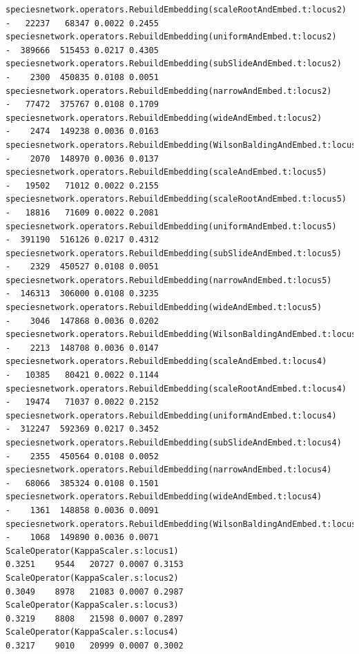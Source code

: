 \documentclass[11pt]{article}
\begin{document}
{\begin{verbatim}
speciesnetwork.operators.RebuildEmbedding(scaleRootAndEmbed.t:locus2)           -   22237   68347 0.0022 0.2455 
speciesnetwork.operators.RebuildEmbedding(uniformAndEmbed.t:locus2)             -  389666  515453 0.0217 0.4305 
speciesnetwork.operators.RebuildEmbedding(subSlideAndEmbed.t:locus2)            -    2300  450835 0.0108 0.0051 
speciesnetwork.operators.RebuildEmbedding(narrowAndEmbed.t:locus2)              -   77472  375767 0.0108 0.1709 
speciesnetwork.operators.RebuildEmbedding(wideAndEmbed.t:locus2)                -    2474  149238 0.0036 0.0163 
speciesnetwork.operators.RebuildEmbedding(WilsonBaldingAndEmbed.t:locus2)       -    2070  148970 0.0036 0.0137 
speciesnetwork.operators.RebuildEmbedding(scaleAndEmbed.t:locus5)               -   19502   71012 0.0022 0.2155 
speciesnetwork.operators.RebuildEmbedding(scaleRootAndEmbed.t:locus5)           -   18816   71609 0.0022 0.2081 
speciesnetwork.operators.RebuildEmbedding(uniformAndEmbed.t:locus5)             -  391190  516126 0.0217 0.4312 
speciesnetwork.operators.RebuildEmbedding(subSlideAndEmbed.t:locus5)            -    2329  450527 0.0108 0.0051 
speciesnetwork.operators.RebuildEmbedding(narrowAndEmbed.t:locus5)              -  146313  306000 0.0108 0.3235 
speciesnetwork.operators.RebuildEmbedding(wideAndEmbed.t:locus5)                -    3046  147868 0.0036 0.0202 
speciesnetwork.operators.RebuildEmbedding(WilsonBaldingAndEmbed.t:locus5)       -    2213  148708 0.0036 0.0147 
speciesnetwork.operators.RebuildEmbedding(scaleAndEmbed.t:locus4)               -   10385   80421 0.0022 0.1144 
speciesnetwork.operators.RebuildEmbedding(scaleRootAndEmbed.t:locus4)           -   19474   71037 0.0022 0.2152 
speciesnetwork.operators.RebuildEmbedding(uniformAndEmbed.t:locus4)             -  312247  592369 0.0217 0.3452 
speciesnetwork.operators.RebuildEmbedding(subSlideAndEmbed.t:locus4)            -    2355  450564 0.0108 0.0052 
speciesnetwork.operators.RebuildEmbedding(narrowAndEmbed.t:locus4)              -   68066  385324 0.0108 0.1501 
speciesnetwork.operators.RebuildEmbedding(wideAndEmbed.t:locus4)                -    1361  148858 0.0036 0.0091 
speciesnetwork.operators.RebuildEmbedding(WilsonBaldingAndEmbed.t:locus4)       -    1068  149890 0.0036 0.0071 
ScaleOperator(KappaScaler.s:locus1)                                        0.3251    9544   20727 0.0007 0.3153 
ScaleOperator(KappaScaler.s:locus2)                                        0.3049    8978   21083 0.0007 0.2987 
ScaleOperator(KappaScaler.s:locus3)                                        0.3219    8808   21598 0.0007 0.2897 
ScaleOperator(KappaScaler.s:locus4)                                        0.3217    9010   20999 0.0007 0.3002 

\end{verbatim}}
\end{document}
